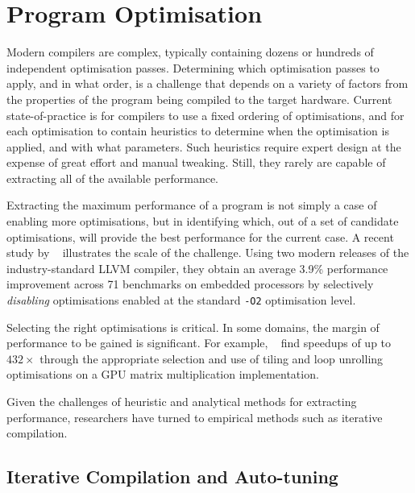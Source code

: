 \section{Program Optimisation}
\label{sec:related-work-optimisation}

Modern compilers are complex, typically containing dozens or hundreds of independent optimisation passes. Determining which optimisation passes to apply, and in what order, is a challenge that depends on a variety of factors from the properties of the program being compiled to the target hardware. Current state-of-practice is for compilers to use a fixed ordering of optimisations, and for each optimisation to contain heuristics to determine when the optimisation is applied, and with what parameters. Such heuristics require expert design at the expense of great effort and manual tweaking. Still, they rarely are capable of extracting all of the available performance.

Extracting the maximum performance of a program is not simply a case of enabling more optimisations, but in identifying which, out of a set of candidate optimisations, will provide the best performance for the current case. A recent study by \citeauthor{Georgiou2018}~\cite{Georgiou2018} illustrates the scale of the challenge. Using two modern releases of the industry-standard LLVM compiler, they obtain an average 3.9\% performance improvement across 71 benchmarks on embedded processors by selectively \emph{disabling} optimisations enabled at the standard \texttt{-O2} optimisation level.

Selecting the right optimisations is critical. In some domains, the margin of performance to be gained is significant. For example, \citeauthor{Ryoo2008a}~\cite{Ryoo2008a} find speedups of up to $432\times$ through the appropriate selection and use of tiling and loop unrolling optimisations on a GPU matrix multiplication implementation.

Given the challenges of heuristic and analytical methods for extracting performance, researchers have turned to empirical methods such as iterative compilation.


\subsection{Iterative Compilation and Auto-tuning}

